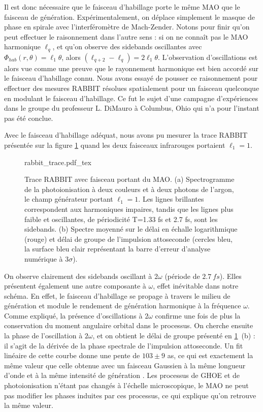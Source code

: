Il est donc nécessaire que le faisceau d'habillage porte le même MAO que le faisceau de génération. Expérimentalement, on déplace simplement le masque de phase en spirale avec l'interféromètre de Mach-Zender. Notons pour finir qu'on peut effectuer le raisonnement dans l'autre sens : si on ne connaît pas le MAO harmonique $\ell_q$, et qu'on observe des sidebands oscillantes avec ${\Phi }_{hab}(r,\theta )=\ell_1\theta$, alors $\left(\ell_{q+2}-\ell_q\right)=2\ell_1\theta$. L'observation d'oscillations est alors vue comme une preuve que le rayonnement harmonique est bien accordé sur le faisceau d'habillage connu. Nous avons essayé de pousser ce raisonnement pour effectuer des mesures RABBIT résolues spatialement pour un faisceau quelconque en modulant le faisceau d'habillage. Ce fut le sujet d'une campagne d'expériences dans le groupe du professeur L. DiMauro à Columbus, Ohio qui n'a pour l'instant pas été conclue.

Avec le faisceau d'habillage adéquat, nous avons pu mesurer la trace RABBIT présentée sur la figure \ref{Fig:omabbit} quand les deux faisceaux infrarouges portaient $\ell_1=1$.

\begin{figure}[!ht]
\centering
\def\svgwidth{\columnwidth}
{rabbit_trace.pdf_tex}
\caption{Trace RABBIT avec faisceau portant du MAO. (a) Spectrogramme de la photoionisation à deux couleurs et à deux photons de l'argon, le champ générateur portant $\ell_1=1$. Les lignes brillantes correspondent aux harmoniques impaires, tandis que les lignes plus faible et oscillantes, de périodicité T=1.33 fs et 2.7 fs, sont les sidebands. (b) Spectre moyenné sur le délai en échalle logarithmique (rouge) et délai de groupe de l'impulsion attoseconde (cercles bleu, la surface bleu clair représentant la barre d'erreur d'analyse numérique à $3\sigma$).}
\label{Fig:omabbit}
\end{figure}

On observe clairement des sidebands oscillant à $2\omega$ (période de  $\SI{2.7}{fs}$). Elles présentent également une autre composante à $\omega$, effet inévitable dans notre schéma. En effet, le faisceau d'habillage se propage à travers le milieu de génération et module le rendement de génération harmonique à la fréquence $\omega$. Comme expliqué, la présence d'oscillations à $2\omega$ confirme une fois de plus la conservation du moment angulaire orbital dans le processus. On cherche ensuite la phase de l'oscillation à $2\omega$, et on obtient le délai de groupe présenté en \ref{Fig:omabbit}~(b) : il s'agit de la dérivée de la phase spectrale de l'impulsion attoseconde. Un fit linéaire de cette courbe donne une pente de $103\pm9$ as, ce qui est exactement la même valeur que celle obtenue avec un faisceau Gaussien à la même longueur d'onde et à la même intensité de génération . Les processus de GHOE et de photoionisation n'étant pas changés à l'échelle microscopique, le MAO ne peut pas modifier les phases induites par ces processus, ce qui explique qu'on retrouve la même valeur.

